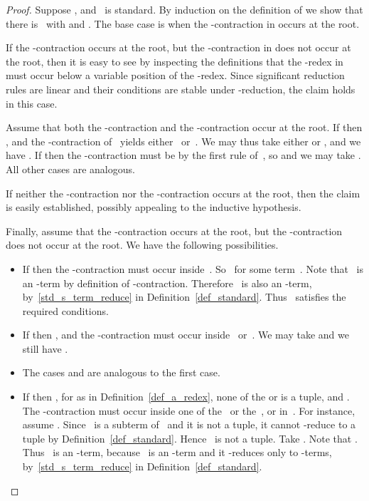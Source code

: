 \documentclass[a4paper,UKenglish]{lipics-v2016}
\begin{document}
\begin{proof}
  Suppose ,  and~ is standard. By
  induction on the definition of  we show that there
  is~ with  and . The
  base case is when the -contraction in  occurs at
  the root.

  If the -contraction occurs at the root, but the -contraction
  in  does not occur at the root, then it is easy to see
  by inspecting the definitions that the -redex in~ must
  occur below a variable position of the -redex. Since significant
  reduction rules are linear and their conditions are stable under
  -reduction, the claim holds in this case.

  Assume that both the -contraction and the -contraction occur
  at the root. If  then
  ,  and the -contraction of~
  yields either~ or~. We may thus take either
   or , and we have
  . If
   then the -contraction must be
  by the first rule of~, so  and we may take
  . All other cases are analogous.

  If neither the -contraction nor the -contraction occurs at the
  root, then the claim is easily established, possibly appealing to
  the inductive hypothesis.

  Finally, assume that the -contraction occurs at the root, but the
  -contraction does not occur at the root. We have the following
  possibilities.
  \begin{itemize}
  \item If  then the
    -contraction must occur inside~. So~ for
    some term~. Note that~ is an -term by definition of
    -contraction. Therefore~ is also an -term,
    by~\ref{std_s_term_reduce} in
    Definition~\ref{def_standard}. Thus~ satisfies the required
    conditions.
  \item If  then ,
     and the -contraction must occur inside~
    or~. We may take  and we still have
    .
  \item The cases  and
     are analogous to the first case.
  \item If
     then
    ,
     for  as in
    Definition~\ref{def_a_redex}, none of the  or  is a
    tuple, and
    . The -contraction must occur
    inside one of the~ or the~, or in~. For
    instance, assume . Since~ is a subterm
    of~ and it is not a tuple, it cannot -reduce to a tuple by
    Definition~\ref{def_standard}. Hence~ is not a tuple. Take
    . Note that
    . Thus~ is an -term, because~ is an
    -term and it -reduces only to -terms,
    by~\ref{std_s_term_reduce} in Definition~\ref{def_standard}.
  \end{itemize}
\end{proof}
\end{document}
